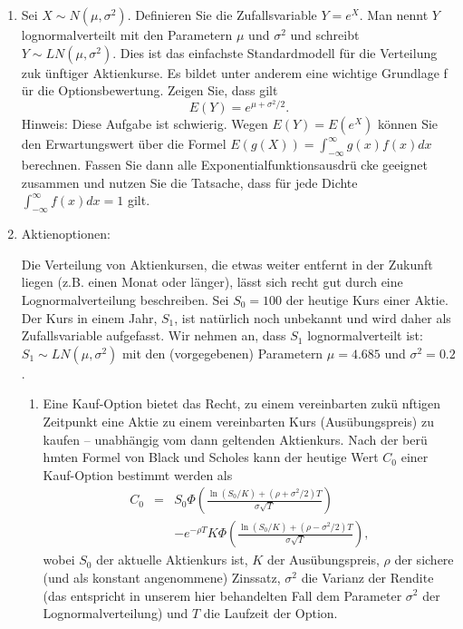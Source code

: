 \begin{enumerate}
\item Sei $X\sim N(\mu ,\sigma ^{2})$. Definieren Sie die
Zufallsvariable $Y=e^{X}$. Man nennt $Y$ lognormalverteilt mit den
Parametern $\mu $ und $\sigma ^{2}$ und schreibt $Y\sim LN(\mu ,\sigma
^{2}). $ Dies ist das einfachste Standardmodell f\"{u}r die Verteilung zuk%
\"{u}nftiger Aktienkurse. Es bildet unter anderem eine wichtige Grundlage f%
\"{u}r die Optionsbewertung. Zeigen Sie, dass gilt%
\begin{equation*}
E(Y)=e^{\mu +\sigma ^{2}/2}.
\end{equation*}%
Hinweis: Diese Aufgabe ist schwierig. Wegen $E(Y)=E(e^{X})$ k\"{o}nnen Sie
den Erwartungswert \"{u}ber die Formel $E(g(X))=\int_{-\infty }^{\infty
}g(x)f(x)dx$ berechnen. Fassen Sie dann alle Exponentialfunktionsausdr\"{u}%
cke geeignet zusammen und nutzen Sie die Tatsache, dass f\"{u}r jede Dichte $%
\int_{-\infty }^{\infty }f(x)dx=1$ gilt.

\item Aktienoptionen:

Die Verteilung von Aktienkursen, die etwas weiter entfernt in der Zukunft
liegen (z.B. einen Monat oder l\"{a}nger), l\"{a}sst sich recht gut durch
eine Lognormalverteilung beschreiben. Sei $S_{0}=100$ der heutige Kurs einer
Aktie. Der Kurs in einem Jahr, $S_{1}$, ist nat\"{u}rlich noch unbekannt und
wird daher als Zufallsvariable aufgefasst. Wir nehmen an, dass $S_{1}$
lognormalverteilt ist: $S_{1}\sim LN(\mu ,\sigma ^{2})$ mit den
(vorgegebenen) Parametern $\mu =4.685$ und $\sigma ^{2}=0.2$.
\begin{enumerate}
\item Eine Kauf-Option bietet das Recht, zu einem vereinbarten zuk\"{u}%
nftigen Zeitpunkt eine Aktie zu einem vereinbarten Kurs (Aus\"{u}bungspreis)
zu kaufen -- unabh\"{a}ngig vom dann geltenden Aktienkurs. Nach der ber\"{u}%
hmten Formel von Black und Scholes kann der heutige Wert $C_{0}$ einer
Kauf-Option bestimmt werden als%
\begin{eqnarray*}
C_{0} &=&S_{0}\Phi \left( \frac{\ln \left( S_{0}/K\right) +\left( \rho
+\sigma ^{2}/2\right) T}{\sigma \sqrt{T}}\right) \\
&&-e^{-\rho T}K\Phi \left( \frac{\ln \left( S_{0}/K\right) +\left( \rho
-\sigma ^{2}/2\right) T}{\sigma \sqrt{T}}\right) ,
\end{eqnarray*}%
wobei $S_{0}$ der aktuelle Aktienkurs ist, $K$ der Aus\"{u}bungspreis, $\rho 
$ der sichere (und als konstant angenommene) Zinssatz, $\sigma ^{2}$ die
Varianz der Rendite (das entspricht in unserem hier behandelten Fall dem
Parameter $\sigma ^{2}$ der Lognormalverteilung) und $T$ die Laufzeit der
Option.


\end{enumerate}
\end{enumerate}
